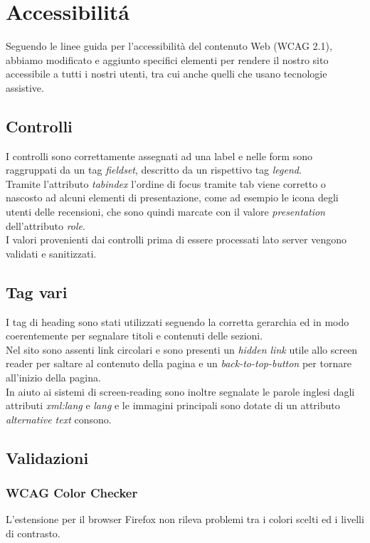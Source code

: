 \section{Accessibilitá}
Seguendo le linee guida per l'accessibilità del contenuto Web (WCAG 2.1), abbiamo modificato e aggiunto specifici elementi per rendere il nostro sito accessibile a tutti i nostri utenti, tra cui anche quelli che usano tecnologie assistive.   
\subsection{Controlli}
I controlli sono correttamente assegnati ad una label e nelle form sono raggruppati da un tag \textit{fieldset}, descritto da un rispettivo tag \textit{legend}.\\
Tramite l'attributo \textit{tabindex} l'ordine di focus tramite tab viene corretto o nascosto ad alcuni elementi di presentazione, come ad esempio le icona degli utenti delle recensioni, che sono quindi marcate con il valore \textit{presentation} dell'attributo \textit{role}.\\
I valori provenienti dai controlli prima di essere processati lato server vengono validati e sanitizzati.

\subsection{Tag vari}
I tag di heading sono stati utilizzati seguendo la corretta gerarchia ed in modo coerentemente per segnalare titoli e contenuti delle sezioni.\\
Nel sito sono assenti link circolari e sono presenti un \textit{hidden link} utile allo screen reader per saltare al contenuto della pagina e un \textit{back-to-top-button} per tornare all'inizio della pagina.\\
In aiuto ai sistemi di screen-reading sono inoltre segnalate le parole inglesi dagli attributi \textit{xml:lang} e \textit{lang} e le immagini principali sono dotate di un attributo \textit{alternative text} consono.


\subsection{Validazioni}


\subsubsection{WCAG Color Checker}
L'estensione per il browser Firefox non rileva problemi tra i colori scelti ed i livelli di contrasto.

